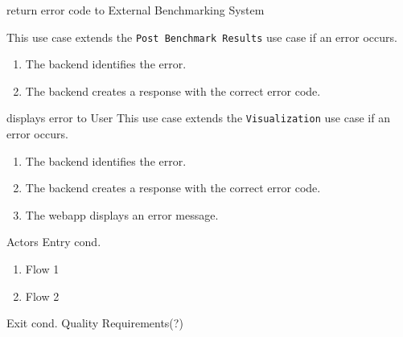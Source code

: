 \bigskip

{return error code to External Benchmarking System}
{}
{This use case extends the \texttt{Post Benchmark Results} use case if an error occurs.
\begin{enumerate}
    \item The backend identifies the error.
    \item The backend creates a response with the correct error code.
\end{enumerate}}
{}
{}

\bigskip

{displays error to User}
{This use case extends the \texttt{Visualization} use case if an error occurs.}
{\begin{enumerate}
    \item The backend identifies the error.
    \item The backend creates a response with the correct error code.
    \item The webapp displays an error message.
\end{enumerate}}
{}
{}

\bigskip

{Actors}
{Entry cond.}
{\begin{enumerate}
    \item Flow 1
    \item Flow 2
\end{enumerate}} 
{Exit cond.}
{Quality Requirements(?)}